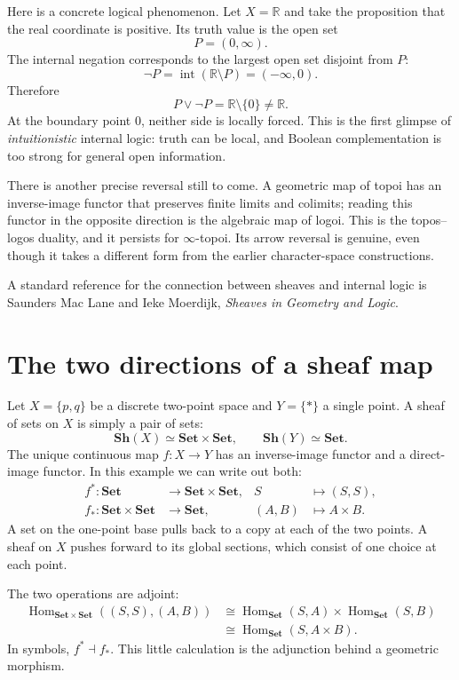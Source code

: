 Here is a concrete logical phenomenon. Let $X=\mathbb R$ and take the proposition that the real coordinate is positive. Its truth value is the open set
\[
 P=(0,\infty).
\]
The internal negation corresponds to the largest open set disjoint from $P$:
\[
 \neg P=\operatorname{int}(\mathbb R\setminus P)=(-\infty,0).
\]
Therefore
\[
 P\vee\neg P=\mathbb R\setminus\{0\}\ne\mathbb R.
\]
At the boundary point $0$, neither side is locally forced. This is the first glimpse of \emph{intuitionistic} internal logic: truth can be local, and Boolean complementation is too strong for general open information.

There is another precise reversal still to come. A geometric map of topoi has an inverse-image functor that preserves finite limits and colimits; reading this functor in the opposite direction is the algebraic map of logoi. This is the topos--logos duality, and it persists for $\infty$-topoi. Its arrow reversal is genuine, even though it takes a different form from the earlier character-space constructions.

A standard reference for the connection between sheaves and internal logic is Saunders Mac Lane and Ieke Moerdijk, \emph{Sheaves in Geometry and Logic}.


\section{The two directions of a sheaf map}

Let $X=\{p,q\}$ be a discrete two-point space and $Y=\{*\}$ a single point. A sheaf of sets on $X$ is simply a pair of sets:
\[
 \mathbf{Sh}(X)\simeq\mathbf{Set}\times\mathbf{Set},
 \qquad
 \mathbf{Sh}(Y)\simeq\mathbf{Set}.
\]
The unique continuous map $f:X\to Y$ has an inverse-image functor and a direct-image functor. In this example we can write out both:
\[
 \begin{aligned}
 f^*:\mathbf{Set}&\longrightarrow\mathbf{Set}\times\mathbf{Set},
       &S&\longmapsto(S,S),\\
 f_*:\mathbf{Set}\times\mathbf{Set}&\longrightarrow\mathbf{Set},
       &(A,B)&\longmapsto A\times B.
 \end{aligned}
\]
A set on the one-point base pulls back to a copy at each of the two points. A sheaf on $X$ pushes forward to its global sections, which consist of one choice at each point.

The two operations are adjoint:
\[
 \begin{aligned}
 \operatorname{Hom}_{\mathbf{Set}\times\mathbf{Set}}
       ((S,S),(A,B))
 &\cong
 \operatorname{Hom}_{\mathbf{Set}}(S,A)
       \times\operatorname{Hom}_{\mathbf{Set}}(S,B)\\
 &\cong\operatorname{Hom}_{\mathbf{Set}}(S,A\times B).
 \end{aligned}
\]
In symbols, $\boxed{f^*\dashv f_*}$. This little calculation is the adjunction behind a geometric morphism.

